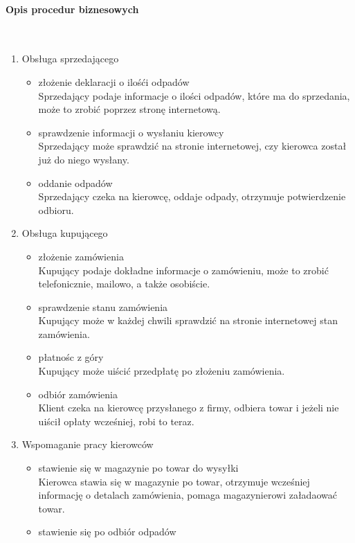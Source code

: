 
\paragraph{Opis procedur biznesowych} \ \\
\begin{enumerate}
	\item Obsługa sprzedającego
		\begin{itemize}
		\item złożenie deklaracji o ilośći odpadów \\
		Sprzedający podaje informacje o ilości odpadów, które ma do sprzedania, może to zrobić poprzez stronę internetową.
		\item sprawdzenie informacji o wysłaniu kierowcy \\ 
		Sprzedający może sprawdzić na stronie internetowej, czy kierowca został już do niego wysłany.
		\item oddanie odpadów \\
		Sprzedający czeka na kierowcę, oddaje odpady, otrzymuje potwierdzenie odbioru.
		\end{itemize}
	\item Obsługa kupującego
		\begin{itemize}
		\item złożenie zamówienia \\
		Kupujący podaje dokładne informacje o zamówieniu, może to zrobić telefonicznie, mailowo, a także osobiście.
		\item sprawdzenie stanu zamówienia \\ 
		Kupujący może w każdej chwili sprawdzić na stronie internetowej stan zamówienia.
		\item płatnośc z góry \\
		Kupujący może uiścić przedpłatę po złożeniu zamówienia.
		\item odbiór zamówienia \\
		Klient czeka na kierowcę przysłanego z firmy, odbiera towar i jeżeli nie uiścił opłaty wcześniej, robi to teraz.
		\end{itemize}
	\item Wspomaganie pracy kierowców 
		\begin{itemize}
		\item stawienie się w magazynie po towar do wysyłki \\ 
		Kierowca stawia się w magazynie po towar, otrzymuje wcześniej informację o detalach zamówienia, pomaga magazynierowi załadaować towar.
		\item stawienie się po odbiór odpadów \\

\end{itemize}
\end{enumerate}
